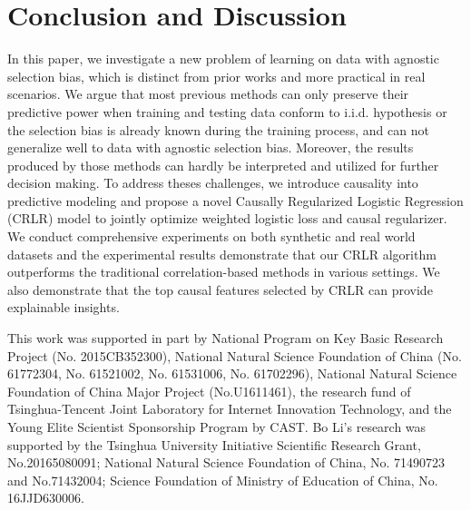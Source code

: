 \documentclass[sigconf]{acmart}
\begin{document}
\section{Conclusion and Discussion}
In this paper, we investigate a new problem of learning on data with agnostic selection bias, which is distinct from prior works and more practical in real scenarios. 
We argue that most previous methods can only preserve their predictive power when training and testing data conform to i.i.d. hypothesis or the selection bias is already known during the training process, and can not generalize well to data with agnostic selection bias.
Moreover, the results produced by those methods can hardly be interpreted and utilized for further decision making.
To address theses challenges, we introduce causality into predictive modeling and propose a novel Causally Regularized Logistic Regression (CRLR) model to jointly optimize weighted logistic loss and causal regularizer. 
We conduct comprehensive experiments on both synthetic and real world datasets and the experimental results demonstrate that our CRLR algorithm outperforms the traditional correlation-based methods in various settings. 
We also demonstrate that the top causal features selected by CRLR can provide explainable insights.

\begin{acks}
This work was supported in part by National Program on Key Basic Research Project (No. 2015CB352300), National Natural Science Foundation of China (No. 61772304, No. 61521002, No. 61531006, No. 61702296), National Natural Science Foundation of China Major Project (No.U1611461), the research fund of Tsinghua-Tencent Joint Laboratory for Internet Innovation Technology, and the Young Elite Scientist Sponsorship Program by CAST.
Bo Li's research was supported by the Tsinghua University Initiative Scientific Research Grant, No.20165080091; National Natural Science Foundation of China, No. 71490723 and No.71432004; Science Foundation of Ministry of Education of China, No. 16JJD630006.
\end{acks}


\balance

\end{document}
